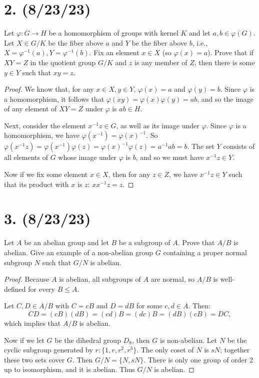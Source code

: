 \documentclass{article}
\begin{document}
\section*{2. (8/23/23)}

Let $\varphi: G \rightarrow H$ be a homomorphism of groups with kernel $K$ and let $a, b \in \varphi(G)$. Let $X \in G/K$ be the fiber above $a$ and $Y$ be the fiber above $b$, i.e., $X = \varphi^{-1}(a), Y = \varphi^{-1}(b)$. Fix an element $x \in X$ (so $\varphi(x) = a$). Prove that if $XY = Z$ in the quotient group $G/K$ and $z$ is any member of $Z$, then there is some $y \in Y$ such that $xy = z$.

\begin{proof}
    We know that, for any $x \in X, y \in Y$, $\varphi(x) = a$ and $\varphi(y) = b$. Since $\varphi$ is a homomorphism, it follows that $\varphi(xy) = \varphi(x)\varphi(y) = ab$, and so the image of any element of $XY = Z$ under $\varphi$ is $ab \in H$.
    
    Next, consider the element $x^{-1}z \in G$, as well as its image under $\varphi$. Since $\varphi$ is a homomorphism, we have $\varphi(x^{-1}) = \varphi(x)^{-1}$. So $\varphi(x^{-1}z) = \varphi(x^{-1})\varphi(z) = \varphi(x)^{-1}\varphi(z) = a^{-1}ab = b$. The set $Y$ consists of all elements of $G$ whose image under $\varphi$ is $b$, and so we must have $x^{-1}z \in Y$.

    Now if we fix some element $x \in X$, then for any $z \in Z$, we have $x^{-1}z \in Y$ such that its product with $x$ is $z$: $x x^{-1}z = z$.
\end{proof}

\section*{3. (8/23/23)}

Let $A$ be an abelian group and let $B$ be a subgroup of $A$. Prove that $A/B$ is abelian. Give an example of a non-abelian group $G$ containing a proper normal subgroup $N$ such that $G/N$ is abelian.

\begin{proof}
    Because $A$ is abelian, all subgroups of $A$ are normal, so $A/B$ is well-defined for every $B \leq A$.

    Let $C, D \in A/B$ with $C = cB$ and $D = dB$ for some $c, d \in A$. Then:
    \begin{equation*}
        CD = (cB)(dB) = (cd)B = (dc)B = (dB)(cB) = DC,
    \end{equation*}
    which implies that $A/B$ is abelian.

    Now if we let $G$ be the dihedral group $D_8$, then $G$ is non-abelian. Let $N$ be the cyclic subgroup generated by $r: \{ 1, r, r^2, r^3 \}$. The only coset of $N$ is $sN$; together these two sets cover $G$. Then $G/N = \{ N, sN \}$. There is only one group of order 2 up to isomorphism, and it is abelian. Thus $G/N$ is abelian.
\end{proof}
\end{document}
